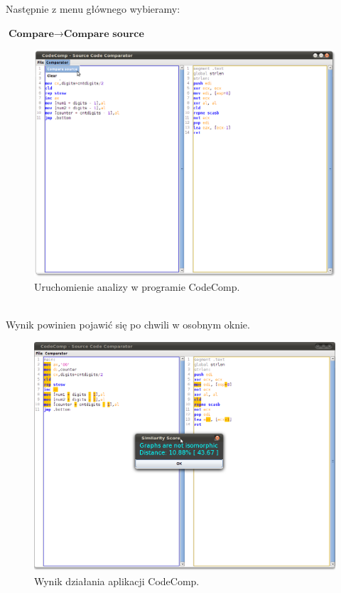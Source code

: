 \documentclass[a4paper,12pt]{article}
\begin{document}
\pagebreak

Następnie z menu głównego wybieramy:

$\textbf{Compare} \rightarrow \textbf{Compare source}$
\begin{figure}[here]
\centering
\includegraphics[scale=0.3]{gfx/compare_source.png}
\caption{Uruchomienie analizy w programie CodeComp.}
\end{figure}
\\
Wynik powinien pojawić się po chwili w osobnym oknie.
\begin{figure}[!]
\centering
\includegraphics[scale=0.3]{gfx/compare_score.png}
\caption{Wynik działania aplikacji CodeComp.}
\end{figure}
\end{document}
